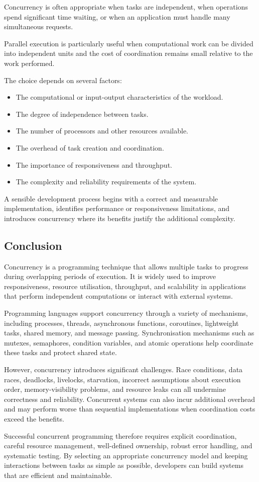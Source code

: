 Concurrency is often appropriate when tasks are independent, when operations spend significant time waiting, or when an application must handle many simultaneous requests.

Parallel execution is particularly useful when computational work can be divided into independent units and the cost of coordination remains small relative to the work performed.

The choice depends on several factors:

\begin{itemize}
    \item The computational or input-output characteristics of the workload.
    \item The degree of independence between tasks.
    \item The number of processors and other resources available.
    \item The overhead of task creation and coordination.
    \item The importance of responsiveness and throughput.
    \item The complexity and reliability requirements of the system.
\end{itemize}

A sensible development process begins with a correct and measurable implementation, identifies performance or responsiveness limitations, and introduces concurrency where its benefits justify the additional complexity.

\subsection{Conclusion}

Concurrency is a programming technique that allows multiple tasks to progress during overlapping periods of execution. It is widely used to improve responsiveness, resource utilisation, throughput, and scalability in applications that perform independent computations or interact with external systems.

Programming languages support concurrency through a variety of mechanisms, including processes, threads, asynchronous functions, coroutines, lightweight tasks, shared memory, and message passing. Synchronisation mechanisms such as mutexes, semaphores, condition variables, and atomic operations help coordinate these tasks and protect shared state.

However, concurrency introduces significant challenges. Race conditions, data races, deadlocks, livelocks, starvation, incorrect assumptions about execution order, memory-visibility problems, and resource leaks can all undermine correctness and reliability. Concurrent systems can also incur additional overhead and may perform worse than sequential implementations when coordination costs exceed the benefits.

Successful concurrent programming therefore requires explicit coordination, careful resource management, well-defined ownership, robust error handling, and systematic testing. By selecting an appropriate concurrency model and keeping interactions between tasks as simple as possible, developers can build systems that are efficient and maintainable.

